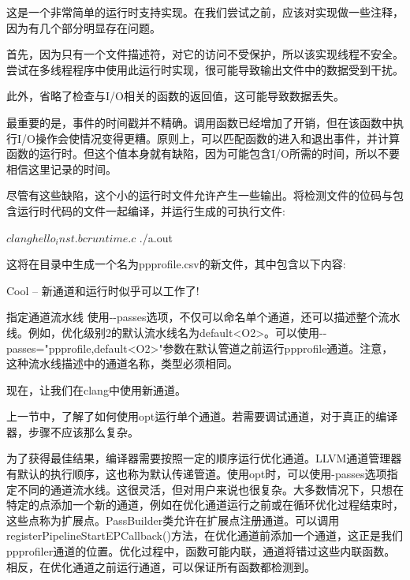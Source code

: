 这是一个非常简单的运行时支持实现。在我们尝试之前，应该对实现做一些注释，因为有几个部分明显存在问题。

首先，因为只有一个文件描述符，对它的访问不受保护，所以该实现线程不安全。尝试在多线程程序中使用此运行时实现，很可能导致输出文件中的数据受到干扰。

此外，省略了检查与I/O相关的函数的返回值，这可能导致数据丢失。

最重要的是，事件的时间戳并不精确。调用函数已经增加了开销，但在该函数中执行I/O操作会使情况变得更糟。原则上，可以匹配函数的进入和退出事件，并计算函数的运行时。但这个值本身就有缺陷，因为可能包含I/O所需的时间，所以不要相信这里记录的时间。

尽管有这些缺陷，这个小的运行时文件允许产生一些输出。将检测文件的位码与包含运行时代码的文件一起编译，并运行生成的可执行文件:

\begin{shell}
$ clang hello_inst.bc runtime.c
$ ./a.out
\end{shell}

这将在目录中生成一个名为ppprofile.csv的新文件，其中包含以下内容:


Cool – 新通道和运行时似乎可以工作了!

\begin{myTip}{指定通道流水线}
使用-{}-passes选项，不仅可以命名单个通道，还可以描述整个流水线。例如，优化级别2的默认流水线名为default<O2>。可以使用-{}-passes="ppprofile,default<O2>"参数在默认管道之前运行ppprofile通道。注意，这种流水线描述中的通道名称，类型必须相同。
\end{myTip}

现在，让我们在clang中使用新通道。


上一节中，了解了如何使用opt运行单个通道。若需要调试通道，对于真正的编译器，步骤不应该那么复杂。

为了获得最佳结果，编译器需要按照一定的顺序运行优化通道。LLVM通道管理器有默认的执行顺序，这也称为默认传递管道。使用opt时，可以使用-passes选项指定不同的通道流水线。这很灵活，但对用户来说也很复杂。大多数情况下，只想在特定的点添加一个新的通道，例如在优化通道运行之前或在循环优化过程结束时，这些点称为扩展点。PassBuilder类允许在扩展点注册通道。可以调用registerPipelineStartEPCallback()方法，在优化通道前添加一个通道，这正是我们ppprofiler通道的位置。优化过程中，函数可能内联，通道将错过这些内联函数。相反，在优化通道之前运行通道，可以保证所有函数都检测到。

